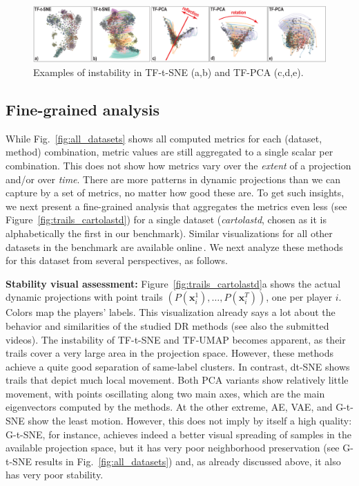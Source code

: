 \begin{figure}[tb]\centering
  \includegraphics[width=\linewidth]{figures/projection-evaluation/instability.eps}
  \caption{Examples of instability in TF-t-SNE (a,b) and TF-PCA (c,d,e).}
  \vspace{-0.15cm}
  \label{fig:instability}
\end{figure}


\subsection{Fine-grained analysis}
%
While Fig.~\ref{fig:all_datasets} shows all computed metrics for each (dataset, method) combination, metric values are still aggregated to a single scalar per combination. This does not show how metrics vary over the \emph{extent} of a projection and/or over \emph{time}. There are more patterns in dynamic projections than we can capture by a set of metrics, no matter how good these are. To get such insights, we next present a fine-grained analysis that aggregates the metrics even less (see Figure~\ref{fig:trails_cartolastd}) for a single dataset (\emph{cartolastd}, chosen as it is alphabetically the first in our benchmark).
Similar visualizations for all other datasets in the benchmark are available online\,\citep{repo}. We next analyze these methods for this dataset from several perspectives, as follows.

\noindent\textbf{Stability visual assessment:} Figure~\ref{fig:trails_cartolastd}a shows the actual dynamic projections with point trails $(P(\mathbf{x}_i^1),\ldots, P(\mathbf{x}_i^T))$, one per player $i$. Colors map the players' labels. This visualization already says a lot about the behavior and similarities of the studied DR methods (see also the submitted videos). The instability of TF-t-SNE and TF-UMAP becomes apparent, as their trails cover a very large area in the projection space. However, these methods achieve a quite good separation of same-label clusters. In contrast, dt-SNE shows trails that depict much local movement. Both PCA variants show relatively little movement, with points oscillating along two main axes, which are the main eigenvectors computed by the methods. At the other extreme, AE, VAE, and G-t-SNE show the least motion. However, this does not imply by itself a high quality: G-t-SNE, for instance, achieves indeed a better visual spreading of samples in the available projection space, but it has very poor neighborhood preservation (see G-t-SNE results in Fig.~\ref{fig:all_datasets}) and, as already discussed above, it also has very poor stability.

